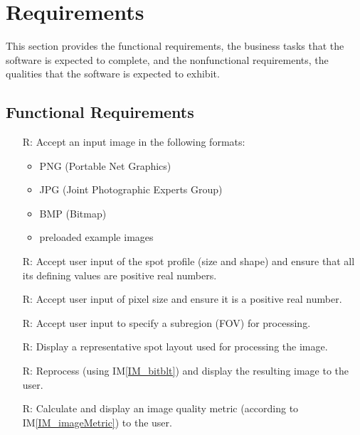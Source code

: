 \documentclass[12pt]{article}
\newcommand{\iref}[1]{IM\ref{#1}}
\newcounter{reqnum} %
\begin{document}
\newpage
\section{Requirements}

This section provides the functional requirements, the business tasks that the
software is expected to complete, and the nonfunctional requirements, the
qualities that the software is expected to exhibit.

\subsection{Functional Requirements}

\noindent \begin{itemize}

\item[R\refstepcounter{reqnum}\thereqnum \label{R_Inputs}:] Accept an input 
image in the following formats:

  \noindent \begin{itemize}
    \item PNG (Portable Net Graphics)
    \item JPG (Joint Photographic Experts Group)
    \item BMP (Bitmap)
    \item preloaded example images
  \end{itemize}

\item[R\refstepcounter{reqnum}\thereqnum \label{R_userSpotProfile}:] Accept user 
input of the spot profile (size and shape) and ensure that all its defining 
values are positive real numbers.

\item[R\refstepcounter{reqnum}\thereqnum \label{R_userPixelSize}:] Accept user 
input of pixel size and ensure it is a positive real number.

\item[R\refstepcounter{reqnum}\thereqnum \label{R_subregion}:] Accept user
input to specify a subregion (FOV) for processing.

\item[R\refstepcounter{reqnum}\thereqnum \label{R_spotLayout}:] Display a 
representative spot layout used for processing the image.

\item[R\refstepcounter{reqnum}\thereqnum \label{R_resultImage}:] Reprocess 
(using \iref{IM_bitblt}) and display the resulting image to the user.

\item[R\refstepcounter{reqnum}\thereqnum \label{R_imageMetric}:] Calculate and 
display an image quality metric (according to \iref{IM_imageMetric}) to the user.

\end{itemize}
\end{document}
